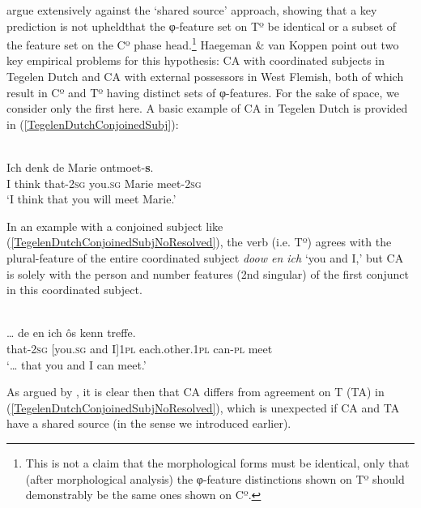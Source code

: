 \documentclass[output=paper
,modfonts
,nonflat
]{langsci/langscibook}
\begin{document}
\citet{Haegeman:2012} argue extensively against the `shared source' approach, showing that a key prediction is not upheld\textemdash that the φ-feature set on Tº be identical or a subset of the feature set on the Cº phase head.\footnote{This is not a claim that the morphological forms must be identical, only that (after morphological analysis) the φ-feature distinctions shown on Tº should demonstrably be the same ones shown on Cº.}  Haegeman \& van Koppen point out two key empirical problems for this hypothesis: CA with coordinated subjects in Tegelen Dutch and CA with external possessors in West Flemish, both of which result in Cº and Tº having distinct sets of φ-features. For the sake of space, we consider only the first here. A basic example of CA in Tegelen Dutch is provided in (\ref{TegelenDutchConjoinedSubj}):

\ea \label{TegelenDutchConjoinedSubj}
 \\
\gll Ich denk de  Marie ontmoet-\textbf{s}.\\
I think that-2\textsc{sg} you.\textsc{sg} Marie meet-2\textsc{sg} \\
\glt `I think that you will meet Marie.'		

\z
\noindent In an example with a conjoined subject like (\ref{TegelenDutchConjoinedSubjNoResolved}), the verb (i.e. Tº) agrees with the plural-feature of the entire coordinated subject \textit{doow en ich} `you and I,' but CA is solely with the person and number features (2nd singular) of the first conjunct in this coordinated subject.

\ea \label{TegelenDutchConjoinedSubjNoResolved}
 \\
\gll … de  en ich ôs kenn treffe.\\
{} that-2\textsc{sg} [you.\textsc{sg} and I]1\textsc{pl} each.other.1\textsc{pl} can-\textsc{pl} meet \\
\glt `… that you and I can meet.'										
\z

\noindent As argued by \citeauthor{Haegeman:2012}, it is clear then that CA differs from agreement on T (TA) in (\ref{TegelenDutchConjoinedSubjNoResolved}), which is unexpected if CA and TA have a shared source (in the sense we introduced earlier). 
\end{document}
